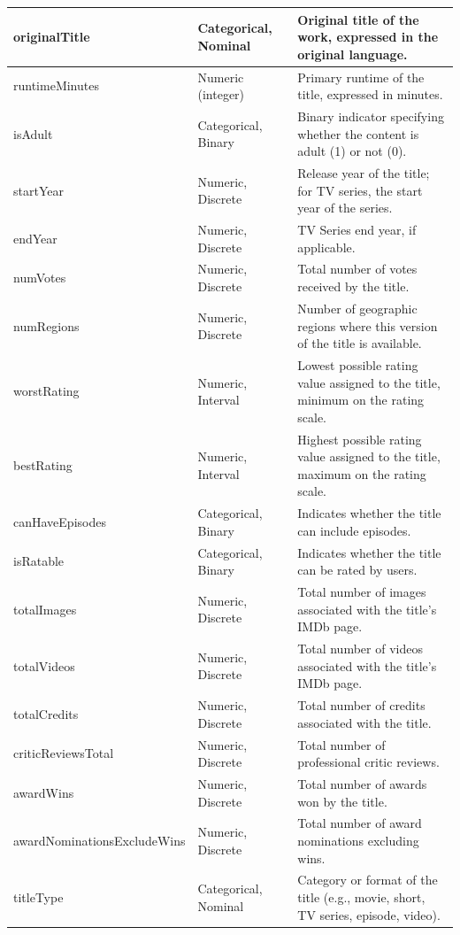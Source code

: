 \documentclass[10pt]{article}
\begin{document}
\begin{center}
\begin{longtable}{| >{\ttfamily}p{5cm} | p{4cm} | p{7cm} |}
originalTitle & Categorical, Nominal & Original title of the work, expressed in the original language. \\
\hline
runtimeMinutes & Numeric (integer) & Primary runtime of the title, expressed in minutes. \\
\hline
isAdult & Categorical, Binary & Binary indicator specifying whether the content is adult (1) or not (0). \\
\hline
startYear & Numeric, Discrete & Release year of the title; for TV series, the start year of the series. \\
\hline
endYear & Numeric, Discrete & TV Series end year, if applicable. \\
\hline
numVotes & Numeric, Discrete & Total number of votes received by the title. \\
\hline
numRegions & Numeric, Discrete & Number of geographic regions where this version of the title is available. \\
\hline
worstRating & Numeric, Interval & Lowest possible rating value assigned to the title, minimum on the rating scale. \\
\hline
bestRating & Numeric, Interval & Highest possible rating value assigned to the title, maximum on the rating scale. \\
\hline
canHaveEpisodes & Categorical, Binary & Indicates whether the title can include episodes. \\
\hline
isRatable & Categorical, Binary & Indicates whether the title can be rated by users. \\
\hline
totalImages & Numeric, Discrete & Total number of images associated with the title’s IMDb page. \\
\hline
totalVideos & Numeric, Discrete & Total number of videos associated with the title’s IMDb page. \\
\hline
totalCredits & Numeric, Discrete & Total number of credits associated with the title. \\
\hline
criticReviewsTotal & Numeric, Discrete & Total number of professional critic reviews. \\
\hline
awardWins & Numeric, Discrete & Total number of awards won by the title. \\
\hline
awardNominationsExcludeWins & Numeric, Discrete & Total number of award nominations excluding wins. \\
\hline
titleType & Categorical, Nominal & Category or format of the title (e.g., movie, short, TV series, episode, video). \\

\end{longtable}
\end{center}
\end{document}
